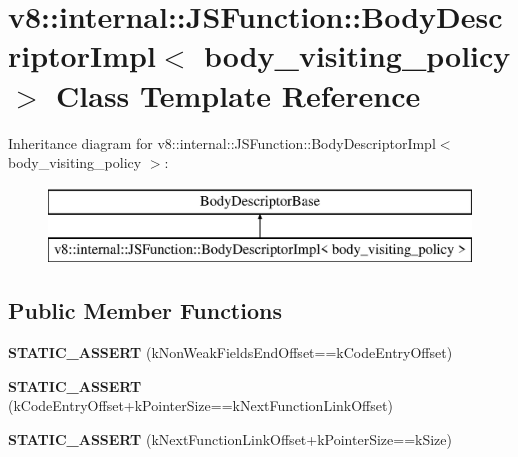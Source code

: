 \hypertarget{classv8_1_1internal_1_1_j_s_function_1_1_body_descriptor_impl}{}\section{v8\+:\+:internal\+:\+:J\+S\+Function\+:\+:Body\+Descriptor\+Impl$<$ body\+\_\+visiting\+\_\+policy $>$ Class Template Reference}
\label{classv8_1_1internal_1_1_j_s_function_1_1_body_descriptor_impl}
Inheritance diagram for v8\+:\+:internal\+:\+:J\+S\+Function\+:\+:Body\+Descriptor\+Impl$<$ body\+\_\+visiting\+\_\+policy $>$\+:\begin{figure}[H]
\begin{center}
\leavevmode
\includegraphics[height=2.000000cm]{classv8_1_1internal_1_1_j_s_function_1_1_body_descriptor_impl}
\end{center}
\end{figure}
\subsection*{Public Member Functions}
\begin{DoxyCompactItemize}
\item 
{\bfseries S\+T\+A\+T\+I\+C\+\_\+\+A\+S\+S\+E\+RT} (k\+Non\+Weak\+Fields\+End\+Offset==k\+Code\+Entry\+Offset)\hypertarget{classv8_1_1internal_1_1_j_s_function_1_1_body_descriptor_impl_a10cc383ab2596dd07fc210eeb2c17df8}{}\label{classv8_1_1internal_1_1_j_s_function_1_1_body_descriptor_impl_a10cc383ab2596dd07fc210eeb2c17df8}

\item 
{\bfseries S\+T\+A\+T\+I\+C\+\_\+\+A\+S\+S\+E\+RT} (k\+Code\+Entry\+Offset+k\+Pointer\+Size==k\+Next\+Function\+Link\+Offset)\hypertarget{classv8_1_1internal_1_1_j_s_function_1_1_body_descriptor_impl_a2c3902a77044ead5bc6b13252f99e680}{}\label{classv8_1_1internal_1_1_j_s_function_1_1_body_descriptor_impl_a2c3902a77044ead5bc6b13252f99e680}

\item 
{\bfseries S\+T\+A\+T\+I\+C\+\_\+\+A\+S\+S\+E\+RT} (k\+Next\+Function\+Link\+Offset+k\+Pointer\+Size==k\+Size)\hypertarget{classv8_1_1internal_1_1_j_s_function_1_1_body_descriptor_impl_a1e8dcf069659f30136f75bb28a38232c}{}\label{classv8_1_1internal_1_1_j_s_function_1_1_body_descriptor_impl_a1e8dcf069659f30136f75bb28a38232c}

\end{DoxyCompactItemize}
